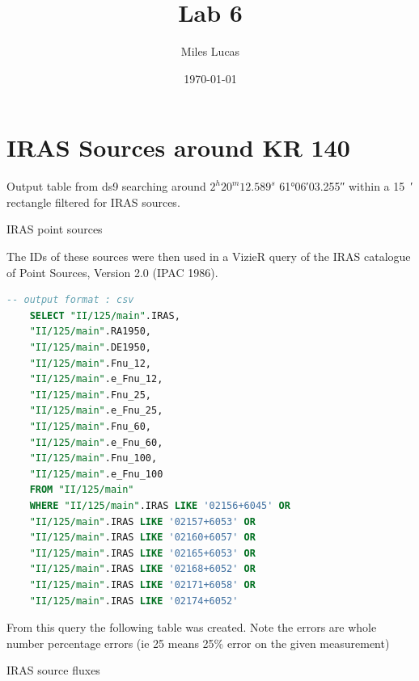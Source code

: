 \documentclass[]{article}
\title{Lab 6}
\author{Miles Lucas}
\date{\today}
\begin{document}
\maketitle

\section{IRAS Sources around KR 140}

Output table from ds9 searching around $ 2^h 20^m 12.589^s $ \ang{+61;06;03.255} within a \SI{15}{\arcminute} rectangle filtered for IRAS sources.
\begin{table}[H]
	\centering
	\caption{IRAS point sources}
	\label{tab:iras}
\end{table}


The IDs of these sources were then used in a VizieR query of the IRAS catalogue of Point Sources, Version 2.0 (IPAC 1986).

\begin{lstlisting}[language=SQL,basicstyle=\footnotesize,frame=single,]
	-- output format : csv
	SELECT "II/125/main".IRAS,  
	"II/125/main".RA1950,  
	"II/125/main".DE1950,  
	"II/125/main".Fnu_12,  
	"II/125/main".e_Fnu_12,  
	"II/125/main".Fnu_25,
	"II/125/main".e_Fnu_25,  
	"II/125/main".Fnu_60,  
	"II/125/main".e_Fnu_60,  
	"II/125/main".Fnu_100,  
	"II/125/main".e_Fnu_100  
	FROM "II/125/main"
	WHERE "II/125/main".IRAS LIKE '02156+6045' OR
	"II/125/main".IRAS LIKE '02157+6053' OR
	"II/125/main".IRAS LIKE '02160+6057' OR
	"II/125/main".IRAS LIKE '02165+6053' OR
	"II/125/main".IRAS LIKE '02168+6052' OR
	"II/125/main".IRAS LIKE '02171+6058' OR
	"II/125/main".IRAS LIKE '02174+6052'
\end{lstlisting}

From this query the following table was created. Note the errors are whole number percentage errors (ie 25 means 25\% error on the given measurement)
\begin{table}[H]
	\centering
	\caption{IRAS source fluxes}
	\label{tab:iras-result}
\end{table}
\end{document}
